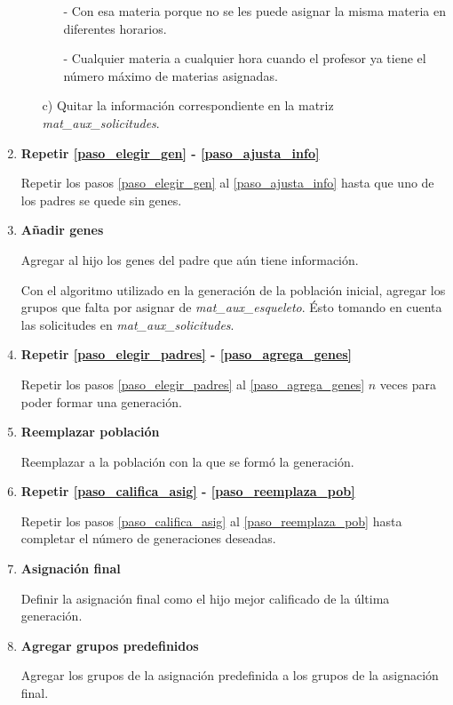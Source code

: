 \begin{enumerate}
\begin{itemize}
\begin{itemize}
\item[-] Con esa materia porque no se les puede asignar la misma materia en diferentes horarios.

\item[-] Cualquier materia a cualquier hora cuando el profesor ya tiene el número máximo de materias asignadas.
\end{itemize}

\item[c)] Quitar la información correspondiente en la matriz \textit{mat\_aux\_solicitudes}.
\end{itemize}

\item \textbf{Repetir \ref{paso_elegir_gen} - \ref{paso_ajusta_info}}

Repetir los pasos \ref{paso_elegir_gen} al \ref{paso_ajusta_info} hasta que uno de los padres se quede sin genes.

\item \textbf{Añadir genes} \label{paso_agrega_genes}

Agregar al hijo los genes del padre que aún tiene información.

Con el algoritmo utilizado en la generación de la población inicial, agregar los grupos que falta por asignar de \textit{mat\_aux\_esqueleto}. Ésto tomando en cuenta las solicitudes en \textit{mat\_aux\_solicitudes}.

\item \textbf{Repetir \ref{paso_elegir_padres} - \ref{paso_agrega_genes}}

Repetir los pasos \ref{paso_elegir_padres} al \ref{paso_agrega_genes} $n$ veces para poder formar una generación.

\item \textbf{Reemplazar población} \label{paso_reemplaza_pob}

Reemplazar a la población con la que se formó la generación.

\item \textbf{Repetir \ref{paso_califica_asig} - \ref{paso_reemplaza_pob}}

Repetir los pasos \ref{paso_califica_asig} al \ref{paso_reemplaza_pob} hasta completar el número de generaciones deseadas.

\item \textbf{Asignación final}

Definir la asignación final como el hijo mejor calificado de la última generación.

\item \textbf{Agregar grupos predefinidos}

Agregar los grupos de la asignación predefinida a los grupos de la asignación final.
\end{enumerate}



